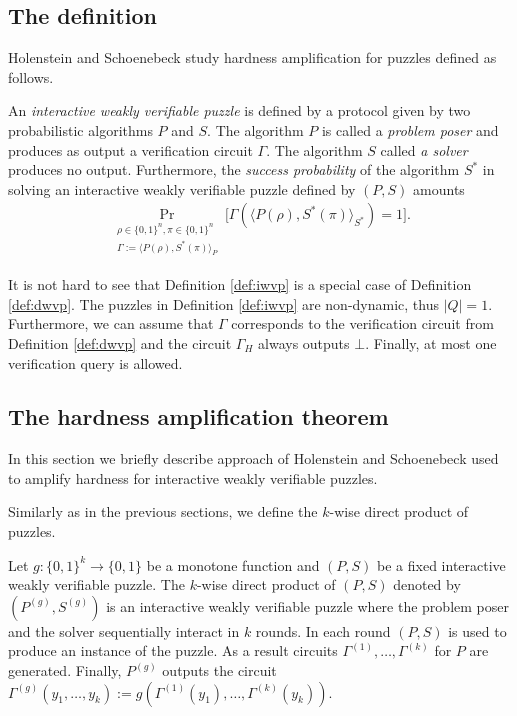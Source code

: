 \subsection{The definition}
Holenstein and Schoenebeck study hardness amplification for puzzles defined as follows.
\begin{definition}
  \label{def:iwvp}
An \textit{interactive weakly verifiable puzzle} is defined by a protocol given by two probabilistic algorithms $P$ and $S$.
The algorithm $P$ is called a \textit{problem poser} and produces as output a verification circuit $\Gamma$.
The algorithm $S$ called \textit{a solver} produces no output.
Furthermore, the \textit{success probability} of the algorithm $S^*$ in solving an interactive weakly verifiable puzzle defined by $(P,S)$ amounts
\begin{align*}
  \underset{\substack{\rho \in \{0,1\}^{n}, \pi \in \{0,1\}^{n} \\ \Gamma := \langle P(\rho), S^*(\pi) \rangle_{P}}}{\Pr}\Big[\Gamma(\langle P(\rho),S^*(\pi) \rangle_{S^*}) = 1 \Big].
\end{align*}
\end{definition}
It is not hard to see that Definition \ref{def:iwvp} is a special case of Definition \ref{def:dwvp}.
The puzzles in Definition \ref{def:iwvp} are non-dynamic, thus $|Q| = 1$. Furthermore, we can assume that $\Gamma$
corresponds to the verification circuit from Definition \ref{def:dwvp} and the circuit $\Gamma_H$ always outputs $\bot$.
Finally, at most one verification query is allowed.

\subsection{The hardness amplification theorem}
In this section we briefly describe approach of Holenstein and Schoenebeck used to amplify hardness for interactive weakly verifiable puzzles.

Similarly as in the previous sections, we define the $k$-wise direct product of puzzles.
\begin{definition}
Let $g: \{0,1\}^{k} \rightarrow \{0,1\}$ be a monotone function and $(P,S)$ be a fixed interactive weakly verifiable puzzle.
The $k$-wise direct product of $(P,S)$ denoted by $(P^{(g)}, S^{(g)})$ is an interactive weakly verifiable puzzle where the problem poser and the solver
sequentially interact in $k$ rounds. In each round $(P,S)$ is used to produce an instance of the puzzle.
As a result circuits $\Gamma^{(1)}, \dotsc, \Gamma^{(k)}$ for $P$ are generated.
Finally, $P^{(g)}$ outputs the circuit $\Gamma^{(g)}(y_1, \dotsc, y_k) := g(\Gamma^{(1)}(y_1), \dotsc, \Gamma^{(k)}(y_k))$.
\end{definition}

